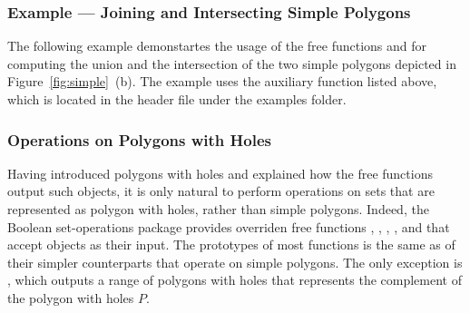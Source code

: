 \subsubsection{Example --- Joining and Intersecting Simple Polygons}
\label{bso_sssec:ex_simple_bops}

The following example demonstartes the usage of the free functions
 and  for computing the union and the
intersection of the two simple polygons depicted in
Figure~\ref{fig:simple}~(b). The example uses the auxiliary function
 listed above, which is located in
the header file  under the examples folder.


\subsubsection{Operations on Polygons with Holes}
\label{bso_sssec:pwh_bops}

Having introduced polygons with holes and explained how the free functions
output such objects, it is only natural to perform operations on sets that
are represented as polygon with holes, rather than simple polygons.
Indeed, the Boolean set-operations package provides overriden free functions
, , , ,
 and  that accept
 objects as their input. The prototypes of
most functions is the same as of their simpler counterparts that operate
on simple polygons. The only exception is , which
outputs a range of polygons with holes that represents the complement
of the polygon with holes $P$.

